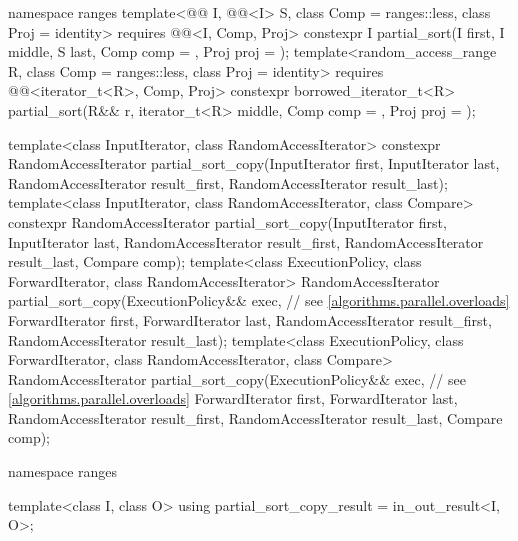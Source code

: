 \begin{codeblock}
{  namespace ranges {
    template<@@ I, @@<I> S, class Comp = ranges::less,
             class Proj = identity>
      requires @@<I, Comp, Proj>
      constexpr I
        partial_sort(I first, I middle, S last, Comp comp = {}, Proj proj = {});
    template<random_access_range R, class Comp = ranges::less, class Proj = identity>
      requires @@<iterator_t<R>, Comp, Proj>
      constexpr borrowed_iterator_t<R>
        partial_sort(R&& r, iterator_t<R> middle, Comp comp = {},
                     Proj proj = {});
  }

  template<class InputIterator, class RandomAccessIterator>
    constexpr RandomAccessIterator
      partial_sort_copy(InputIterator first, InputIterator last,
                        RandomAccessIterator result_first,
                        RandomAccessIterator result_last);
  template<class InputIterator, class RandomAccessIterator, class Compare>
    constexpr RandomAccessIterator
      partial_sort_copy(InputIterator first, InputIterator last,
                        RandomAccessIterator result_first,
                        RandomAccessIterator result_last,
                        Compare comp);
  template<class ExecutionPolicy, class ForwardIterator, class RandomAccessIterator>
    RandomAccessIterator
      partial_sort_copy(ExecutionPolicy&& exec,                 // see \ref{algorithms.parallel.overloads}
                        ForwardIterator first, ForwardIterator last,
                        RandomAccessIterator result_first,
                        RandomAccessIterator result_last);
  template<class ExecutionPolicy, class ForwardIterator, class RandomAccessIterator,
           class Compare>
    RandomAccessIterator
      partial_sort_copy(ExecutionPolicy&& exec,                 // see \ref{algorithms.parallel.overloads}
                        ForwardIterator first, ForwardIterator last,
                        RandomAccessIterator result_first,
                        RandomAccessIterator result_last,
                        Compare comp);

  namespace ranges {
    template<class I, class O>
      using partial_sort_copy_result = in_out_result<I, O>;

}}
\end{codeblock}
